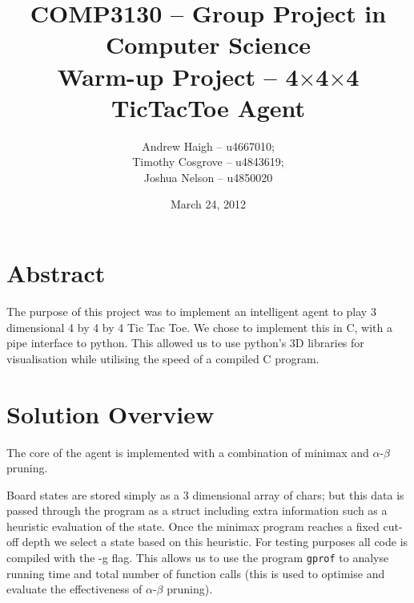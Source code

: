 \documentclass[10pt,twocolumn]{article}
\title{COMP3130 -- Group Project in Computer Science\\ Warm-up Project -- 4$\times$4$\times$4 TicTacToe Agent}
\date{March 24, 2012}
\author{Andrew Haigh -- u4667010;\\ Timothy Cosgrove -- u4843619;\\ Joshua Nelson -- u4850020}
\begin{document}
\onecolumn
\maketitle
\twocolumn
\section{Abstract}
The purpose of this project was to implement an intelligent agent to play 3
dimensional 4 by 4 by 4 Tic Tac Toe. We chose to implement this in C, with a
pipe interface to python. This allowed us to use python's 3D libraries for visualisation
while utilising the speed of a compiled C program.

\section{Solution Overview}
The core of the agent is implemented with a combination of minimax and $\alpha$-$\beta$ pruning.

Board states are stored simply as a 3 dimensional array of chars; but this data is passed
through the program as a struct including extra information such as a heuristic evaluation
of the state. Once the minimax program reaches a fixed cut-off depth we select a state based on
this heuristic. For testing purposes all code is compiled with the -g flag. This allows
us to use the program \texttt{gprof} to analyse running time and total number of function calls
(this is used to optimise and evaluate the effectiveness of $\alpha$-$\beta$ pruning).
\end{document}
